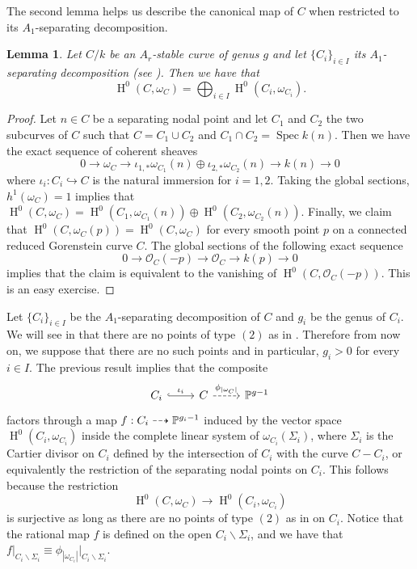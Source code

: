 \documentclass{alggeom}
\numberwithin{equation}{section}
\numberwithin{subsection}{section}
\newtheorem{lemma}[theorem]{Lemma}
\theoremstyle{definition}
\theoremstyle{remark}
\newcommand\cO{\mathcal{O}} \newcommand\cP{\mathcal{P}}
\renewcommand\H{\operatorname{H}}
\newcommand\spec{\operatorname{Spec}}
\renewcommand{\setminus}{\smallsetminus}
\begin{document}
The second lemma helps us describe the canonical map of $C$ when restricted to its $A_1$-separating decomposition.

\begin{lemma}\label{lem:sep-decom-hodge}
Let $C/k$ be an $A_r$-stable curve of genus $g$ and let $\{C_i\}_{i \in I}$ its $A_1$-separating decomposition (see ). Then we have that 
$$\H^0(C,\omega_C)=\bigoplus_{i \in I}\H^0(C_i,\omega_{C_i}).$$	
\end{lemma}

\begin{proof}
	Let $n \in C$ be a separating nodal point and let $C_1$ and $C_2$ the two subcurves of $C$ such that $C=C_1\cup C_2$ and $C_1\cap C_2=\spec k(n)$. Then we have the exact sequence of coherent sheaves
	$$ 0 \rightarrow \omega_C \rightarrow \iota_{1,*}\omega_{C_1}(n)\oplus \iota_{2,*}\omega_{C_2}(n) \rightarrow k(n) \rightarrow 0$$
	where $\iota_i:C_i \hookrightarrow C$ is the natural immersion for $i=1,2$. Taking the global sections, $h^1(\omega_C)=1$ implies that $\H^0(C,\omega_C)=\H^0(C_1,\omega_{C_1}(n))\oplus\H^0(C_2,\omega_{C_2}(n))$. Finally, we claim that $\H^0(C,\omega_C(p))=\H^0(C,\omega_C)$ for every smooth point $p$ on a connected reduced Gorenstein curve $C$. The global sections of the following exact sequence 
	$$0 \rightarrow \cO_C(-p) \rightarrow \cO_C \rightarrow k(p) \rightarrow 0$$
	implies that the claim is equivalent to the vanishing of $\H^0(C,\cO_C(-p))$. This is an easy exercise.
\end{proof}
Let $\{C_i\}_{i \in I}$ be the $A_1$-separating decomposition of $C$ and $g_i$ be the genus of $C_i$. We will see in  that there are no points of type $(2)$ as in . Therefore from now on, we suppose that there are no such points and in particular, $g_i>0$ for every $i \in I$.
The previous result implies that the composite 
$$
\begin{tikzcd}
C_i \arrow[r, "\iota_i", hook] & C \arrow[r, "\phi_{|\omega_C|}", dashed] & \PP^{g-1}
\end{tikzcd}
$$
factors through a map $f:C_i\dashrightarrow \mathbb{P}^{g_i-1}$ induced by the vector space $\H^0(C_i,\omega_{C_i})$ inside the complete linear system of $\omega_{C_i}(\Sigma_i)$, where $\Sigma_i$ is the Cartier divisor on $C_i$ defined by the intersection of $C_i$ with the curve $C-C_i$, or equivalently the restriction of the separating nodal points on $C_i$. This follows because the restriction
$$ \H^0(C,\omega_C)  \longrightarrow \H^0(C_i,\omega_{C_i})$$
is surjective as long as there are no points of type $(2)$ as in   on $C_i$. Notice that the rational map $f$ is defined on the open $C_i\setminus \Sigma_i$, and we have that $f\vert_{C_i\setminus \Sigma_i}\equiv \phi_{|\omega_{C_i}|}\vert_{C_i\setminus \Sigma_i}$.
\end{document}
